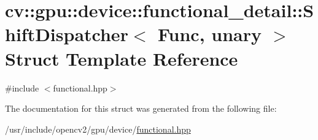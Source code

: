 \hypertarget{structcv_1_1gpu_1_1device_1_1functional__detail_1_1ShiftDispatcher}{\section{cv\-:\-:gpu\-:\-:device\-:\-:functional\-\_\-detail\-:\-:Shift\-Dispatcher$<$ Func, unary $>$ Struct Template Reference}
\label{structcv_1_1gpu_1_1device_1_1functional__detail_1_1ShiftDispatcher}
}


{\ttfamily \#include $<$functional.\-hpp$>$}



The documentation for this struct was generated from the following file\-:\begin{DoxyCompactItemize}
\item 
/usr/include/opencv2/gpu/device/\hyperlink{functional_8hpp}{functional.\-hpp}\end{DoxyCompactItemize}

